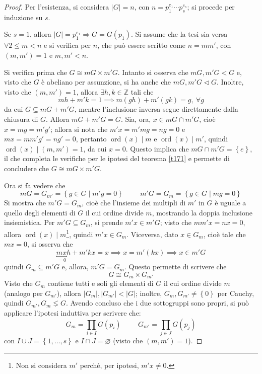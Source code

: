 \documentclass[12pt]{scrartcl}
\theoremstyle{style}
\numberwithin{equation}{subsection}
\begin{document}
	\begin{proof}
		Per l'esistenza, si considera $\lvert G \rvert =n$, con $n= p_1^{e_1}\cdots p_s^{e_s}$; si procede per induzione su $s$.

		Se $s=1$, allora $\lvert G \rvert =p_1^{e_1}\Rightarrow G=G(p_1)$.
		Si assume che la tesi sia versa $\forall 2\le m<n$ e si verifica per $n$, che pu\`o essere scritto come $n = m m'$, con $(m,m') = 1$ e $m,m' < n$.
		
		Si verifica prima che $G \cong mG \times m' G$.
		Intanto si osserva che $mG,m'G < G$ e, visto che $G$ \`e abeliano per assunzione, si ha anche che $mG,m'G\lhd G$.
		Inoltre, visto che $(m,m') = 1$, allora $\exists h,k \in \mathbb{Z}$ tali che 
		\[
		mh + m'k =1 \implies m(gh) +m'(gk) =g, \ \forall g
		\] 
		da cui $G \subseteq mG + m'G$, mentre l'inclusione inversa segue direttamente dalla chiusura di $G$. 
		Allora $mG + m'G = G$.
		Sia, ora, $x \in mG \cap m'G$, cio\`e $x = mg = m'g'$; allora si nota che $m'x= m'mg = ng = 0$ e $mx=mm'g' = ng' = 0$, pertanto $\operatorname{ord}(x)  \mid m$ e $\operatorname{ord}(x)  \mid m'$, quindi $\operatorname{ord}(x)  \mid (m,m') = 1$, da cui $x=0$.
		Questo implica che $mG\cap m'G = \left\{ e \right\} $, il che completa le verifiche per le ipotesi del teorema \ref{t171} e permette di concludere che $G \cong mG \times m'G$.

		Ora si fa vedere che 
		\[
		mG = G_{m'} = \left\{ g \in G  \mid m'g=0 \right\} \hspace{1cm} m'G = G_m = \left\{ g \in G \mid mg = 0 \right\} 
		\] 
		Si mostra che $m'G = G_m$, cio\`e che l'insieme dei multipli di $m'$ in $G$ \`e uguale a quello degli elementi di $G$ il cui ordine divide $m$, mostrando la doppia inclusione insiemistica.
		Per $m'G \subseteq G_m$, si prende $m'x \in m'G$; visto che $mm'x = n x = 0$, allora $\operatorname{ord}(x)  \mid m$\footnote{Non si considera $m'$ perch\'e, per ipotesi, $m'x\neq 0$.}, quindi $m'x \in G_m$.
		Viceversa, dato $x \in G_m$, cio\`e tale che $mx = 0$, si osserva che
		\[
			\underbracket{mx}_{=0} h + m'kx = x \implies x = m'(kx) \implies x \in  m'G
		\] 
		quindi $G_m \subseteq m'G$ e, allora, $m'G = G_m$.
		Questo permette di scrivere che 
		\[
		G \cong G_m \times G_{m'} 
		\] 
		Visto che $G_m$ contiene tutti e soli gli elementi di $G$ il cui ordine divide $m$ (analogo per $G_{m'} $), allora $\lvert G_m \rvert ,\lvert G_{m'}  \rvert < \lvert G \rvert $; inoltre, $G_{m} , G_{m'} \neq \left\{ 0 \right\} $ per Cauchy, quindi $G_{m'},G_m \lneq G $.
		Avendo concluso che i due sottogruppi sono propri, si pu\`o applicare l'ipotesi induttiva per scrivere che:
		\[
		G_m = \prod _{i\in I} G(p_i) \hspace{1cm}G_{m'} =\prod_{j \in J} G(p_j)
		\] 
		con $I\cup J = \left\{ 1, \ldots, s \right\} $ e $I\cap J = \varnothing$ (visto che $(m,m')=1$).


\end{proof}
\end{document}
